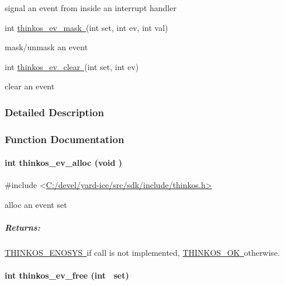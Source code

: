 {{signal an event from inside an interrupt handler }

{int
}{\protect\hyperlink{h.19c6y18}{thinkos\_ev\_mask}}{\protect\hyperlink{h.19c6y18}{~}}{(int
set, int ev, int val)}

{mask/unmask an event }

{int
}{\protect\hyperlink{h.3tbugp1}{thinkos\_ev\_clear}}{\protect\hyperlink{h.3tbugp1}{~}}{(int
set, int ev)}

{clear an event }

{}

\subsubsection{\texorpdfstring{{Detailed
Description}}{Detailed Description}}\label{detailed-description-5}

{}

{}

\subsubsection{\texorpdfstring{{Function
Documentation}}{Function Documentation}}\label{function-documentation-5}

\paragraph{\texorpdfstring{{int thinkos\_ev\_alloc (void
)}}{int thinkos\_ev\_alloc (void )}}\label{int-thinkos_ev_alloc-void}

{}

{\#include
\textless{}}{\protect\hyperlink{h.pkwqa1}{C:/devel/yard-ice/src/sdk/include/thinkos.h}}{\protect\hyperlink{h.pkwqa1}{\textgreater{}}}

{alloc an event set }

{}

\subparagraph{\texorpdfstring{{Returns:}}{Returns:}}\label{returns-29}

{\protect\hyperlink{h.3s49zyc}{THINKOS\_ENOSYS}}{\protect\hyperlink{h.3s49zyc}{~}}{if
call is not implemented,
}{\protect\hyperlink{h.2fk6b3p}{THINKOS\_OK}}{\protect\hyperlink{h.2fk6b3p}{~}}{otherwise.
}

\paragraph{\texorpdfstring{{int thinkos\_ev\_free (int
~set)}}{int thinkos\_ev\_free (int ~set)}}\label{int-thinkos_ev_free-int-set}

}
